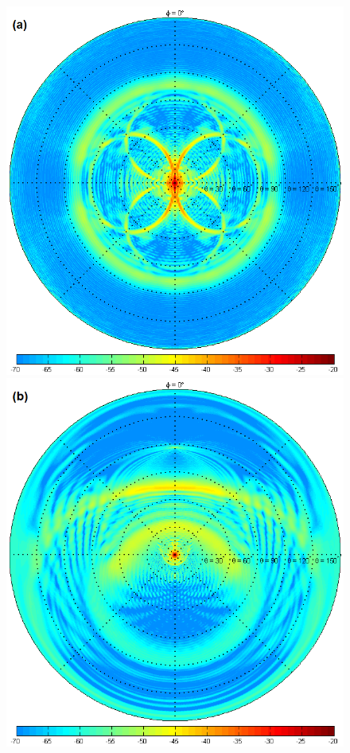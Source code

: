 \documentclass{aa}
\begin{document}
\begin{figure}
  \includegraphics[width=\columnwidth,clip=true,trim=0 42 0 0]{K7s_full}\hfill%
  \includegraphics[width=\columnwidth,clip=true,trim=0 42 0 0]{TU3e20_full}

\end{figure}
\end{document}
